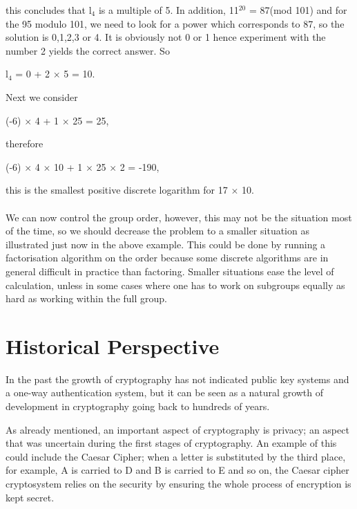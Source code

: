 \documentclass[iwp,first]{luthesis}
\begin{document}
this concludes that l$_4$ is a multiple of 5. In addition, 11$^{20}$ = 87(mod 101) and for the 95 modulo 101, we need to look for a power which corresponds to 87, so the solution is 0,1,2,3 or 4. It is obviously not 0 or 1 hence experiment with the number 2 yields the correct answer. So

\begin{center}
l$_4$ = 0 + 2 $\times$ 5 = 10. 
\end{center}

Next we consider 

\begin{center}
(-6) $\times$ 4 + 1 $\times$ 25 = 25, 
\end{center}

therefore 

\begin{center}
(-6) $\times$ 4 $\times$ 10 + 1 $\times$ 25 $\times$ 2 = -190, 
\end{center}

this is the smallest positive discrete logarithm for 17 $\times$ 10.
\\
\\
We can now control the group order, however, this may not be the situation most of the time, so we should decrease the problem to a smaller situation as illustrated just now in the above example. This could be done by running a factorisation algorithm on the order because some discrete algorithms are in general difficult in practice than factoring. Smaller situations ease the level of calculation, unless in some cases where one has to work on subgroups equally as hard as  working within the full group.

\section{Historical Perspective}

In the past the growth of cryptography has not indicated public key systems and a one-way authentication system, but it can be seen as a natural growth of development in cryptography going back to hundreds of years.

As already mentioned, an important aspect of cryptography is privacy; an aspect that was uncertain during the first stages of cryptography. An example of this could include the Caesar Cipher; when a letter is substituted by the third place, for example, A is carried to D and B is carried to E and so on, the Caesar cipher cryptosystem relies on the security by ensuring the whole process of encryption is kept secret. 
\end{document}
